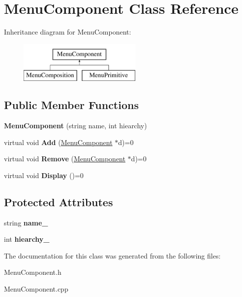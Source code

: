 \hypertarget{classMenuComponent}{\section{Menu\-Component Class Reference}
\label{classMenuComponent}
}
Inheritance diagram for Menu\-Component\-:\begin{figure}[H]
\begin{center}
\leavevmode
\includegraphics[height=2.000000cm]{d2/dfd/classMenuComponent}
\end{center}
\end{figure}
\subsection*{Public Member Functions}
\begin{DoxyCompactItemize}
\item 
\hypertarget{classMenuComponent_a89f2473dbe9c3516ed67d6d4de941acd}{{\bfseries Menu\-Component} (string name, int hiearchy)}\label{classMenuComponent_a89f2473dbe9c3516ed67d6d4de941acd}

\item 
\hypertarget{classMenuComponent_aac643f9f5e0e1c146b76af7fa733396f}{virtual void {\bfseries Add} (\hyperlink{classMenuComponent}{Menu\-Component} $\ast$d)=0}\label{classMenuComponent_aac643f9f5e0e1c146b76af7fa733396f}

\item 
\hypertarget{classMenuComponent_abc5764fee211d1ce432fcd59584d2d32}{virtual void {\bfseries Remove} (\hyperlink{classMenuComponent}{Menu\-Component} $\ast$d)=0}\label{classMenuComponent_abc5764fee211d1ce432fcd59584d2d32}

\item 
\hypertarget{classMenuComponent_a65386099aca32e9b81b4eb973e60ece1}{virtual void {\bfseries Display} ()=0}\label{classMenuComponent_a65386099aca32e9b81b4eb973e60ece1}

\end{DoxyCompactItemize}
\subsection*{Protected Attributes}
\begin{DoxyCompactItemize}
\item 
\hypertarget{classMenuComponent_ac21370585d3f6a32f0b6ed8de00245b8}{string {\bfseries name\-\_\-}}\label{classMenuComponent_ac21370585d3f6a32f0b6ed8de00245b8}

\item 
\hypertarget{classMenuComponent_a391646eec6bf36ff63fecce621943b57}{int {\bfseries hiearchy\-\_\-}}\label{classMenuComponent_a391646eec6bf36ff63fecce621943b57}

\end{DoxyCompactItemize}


The documentation for this class was generated from the following files\-:\begin{DoxyCompactItemize}
\item 
Menu\-Component.\-h\item 
Menu\-Component.\-cpp\end{DoxyCompactItemize}
